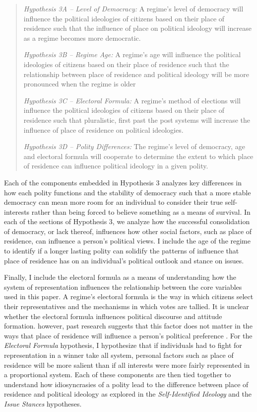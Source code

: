 \documentclass[12pt, titlepage]{article}
\newcommand\e{\emph}
\begin{document}
\begin{quote}
	\e{Hypothesis 3A -- Level of Democracy:} A regime's level of democracy will influence the political ideologies of citizens based on their place of residence such that the influence of place on political ideology will increase as a regime becomes more democratic. 
	
	\e{Hypothesis 3B -- Regime Age:} A regime's age will influence the political ideologies of citizens based on their place of residence such that the relationship between place of residence and political ideology will be more pronounced when the regime is older
	
	\e{Hypothesis 3C -- Electoral Formula:} A regime's method of elections will influence the political ideologies of citizens based on their place of residence such that pluralistic, first past the post systems will increase the influence of place of residence on political ideologies.
	
	\e{Hypothesis 3D -- Polity Differences:} The regime's level of democracy, age and electoral formula will cooperate to determine the extent to which place of residence can influence political ideology in a given polity.
\end{quote}

Each of the components embedded in Hypothesis 3 analyzes key differences in how each polity functions and the stability of democracy such that a more stable democracy can mean more room for an individual to consider their true self-interests rather than being forced to believe something as a means of survival. In each of the sections of Hypothesis 3, we analyze how the successful consolidation of democracy, or lack thereof, influences how other social factors, such as place of residence, can influence a person's political views. I include the age of the regime to identify if a longer lasting polity can solidify the patterns of influence that place of residence has on an individual's political outlook and stance on issues. 

Finally, I include the electoral formula as a means of understanding how the system of representation influences the relationship between the core variables used in this paper. A regime's electoral formula is the way in which citizens select their representatives and the mechanisms in which votes are tallied. It is unclear whether the electoral formula influences political discourse and attitude formation. however, past research suggests that this factor does not matter in the ways that place of residence will influence a person's political preference \cite{barkan_space_2006}. For the \e{Electoral Formula} hypothesis, I hypothesize that if individuals had to fight for representation in a winner take all system, personal factors such as place of residence will be more salient than if all interests were more fairly represented in a proportional system. Each of these components are then tied together to understand how idiosyncrasies of a polity lead to the difference between place of residence and political ideology as explored in the \e{Self-Identified Ideology} and the \e{Issue Stances} hypotheses.
\end{document}
